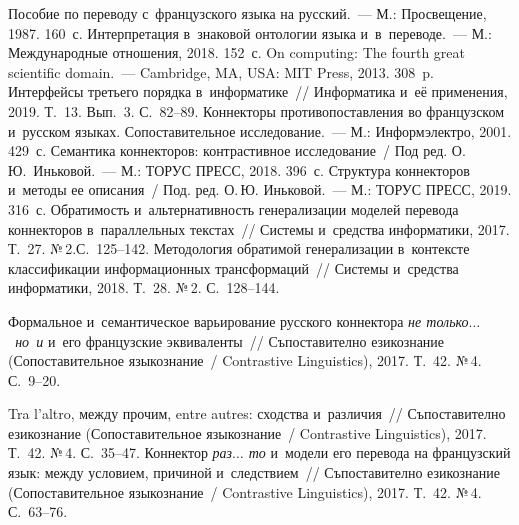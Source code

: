 \begin{multicols}{2}
{{\begin{thebibliography}{99}
 Пособие по переводу с~французского языка на русский.~--- М.: 
Просвещение, 1987. 160~с.
 Интерпретация в~знаковой онтологии языка и~в~переводе.~--- М.: 
Международные отношения, 2018. 152~с.
 On computing: The fourth great scientific domain.~--- 
Cambridge, MA, USA: MIT Press, 
2013. 308~p.
 Интерфейсы третьего порядка в~информатике~// Информатика и~её 
применения, 2019. Т.~13. Вып.~3. С.~82--89.
 Коннекторы противопоставления во французском 
и~русском языках. Сопоставительное исследование.~--- М.: Информэлектро, 2001. 429~с.
Семантика коннекторов: контрастивное исследование~/ Под ред. О.\,Ю.~Иньковой.~--- М.: 
ТОРУС ПРЕСС, 2018. 396~с.
Структура коннекторов и~методы ее описания~/ Под. ред. О.\,Ю. Иньковой.~--- М.: ТОРУС 
ПРЕСС, 2019. 316~с.
Обратимость и~альтернативность 
генерализации моделей перевода коннекторов в~параллельных текстах~// Сис\-темы 
и~средства информатики, 2017. Т.~27. №\,2.\linebreak С.~125--142.
 Методология обратимой генерализации в~контексте классификации 
информационных трансформаций~// Сис\-те\-мы и~средства информатики, 2018. Т.~28. №\,2. 
С.~128--144.

 Формальное и~семантическое варьирование русского коннектора 
\textit{не только$\ldots$\ но~и} и~его французские эквиваленты~// Съпоставително 
езикознание (Сопоставительное языкознание~/ Contrastive Linguistics), 2017. Т.~42. №\,4. 
С.~9--20.

 Tra l'altro, между прочим, entre autres: сходства 
и~различия~// Съпоставително езикознание (Сопоставительное языкознание~/ Contrastive 
Linguistics), 2017. Т.~42. №\,4. С.~35--47.
 Коннектор \textit{раз$\ldots$ то} и~модели его перевода на французский 
язык: между условием, причиной и~следствием~// Съпоставително езикознание 
(Сопоставительное языкознание~/ Contrastive Linguistics), 2017. Т.~42. №\,4. С.~63--76.
\end{thebibliography}

 }
 }

\end{multicols}

\vspace*{-6pt}


